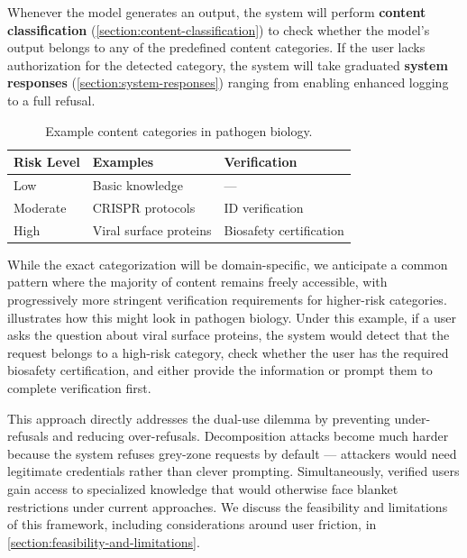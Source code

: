 \documentclass{article}
\theoremstyle{plain}
\theoremstyle{definition}
\theoremstyle{remark}
\begin{document}
Whenever the model generates an output, the system will perform \textbf{content classification} (\cref{section:content-classification}) to check whether the model's output belongs to any of the predefined content categories.
If the user lacks authorization for the detected category, the system will take graduated \textbf{system responses} (\cref{section:system-responses}) ranging from enabling enhanced logging to a full refusal.

\begin{table}[t]
  \caption{Example content categories in pathogen biology.}
  \vspace{0.1in}
  \label{table:biology-examples}
  \centering
  \small
  \begin{tabular}{lll}
    \toprule
    \textbf{Risk Level} & \textbf{Examples} & \textbf{Verification} \\
    \midrule
    Low & Basic knowledge & --- \\
    Moderate & CRISPR protocols & ID verification \\
    High & Viral surface proteins & Biosafety certification \\
    \bottomrule
  \end{tabular}
\end{table}

While the exact categorization will be domain-specific, we anticipate a common pattern where the majority of content remains freely accessible, with progressively more stringent verification requirements for higher-risk categories.
 illustrates how this might look in pathogen biology.
Under this example, if a user asks the question about viral surface proteins, the system would detect that the request belongs to a high-risk category, check whether the user has the required biosafety certification, and either provide the information or prompt them to complete verification first.

This approach directly addresses the dual-use dilemma by preventing under-refusals and reducing over-refusals.
Decomposition attacks become much harder because the system refuses grey-zone requests by default --- attackers would need legitimate credentials rather than clever prompting.
Simultaneously, verified users gain access to specialized knowledge that would otherwise face blanket restrictions under current approaches.
We discuss the feasibility and limitations of this framework, including considerations around user friction, in \cref{section:feasibility-and-limitations}.
\end{document}
